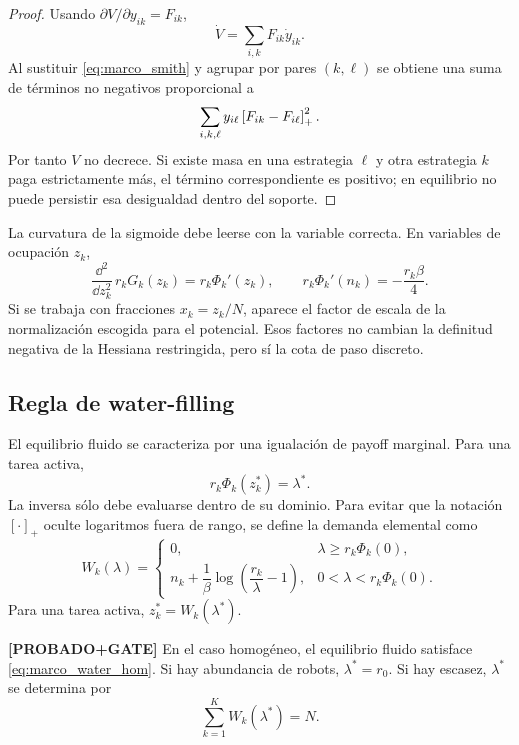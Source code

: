 \begin{proof}
Usando $\partial V/\partial y_{ik}=F_{ik}$,
\[
  \dot V=\sum_{i,k}F_{ik}\dot y_{ik}.
\]
Al sustituir \eqref{eq:marco_smith} y agrupar por pares $(k,\ell)$ se obtiene una suma
de términos no negativos proporcional a
\[
  \sum_{i,k,\ell}y_{i\ell}\left[F_{ik}-F_{i\ell}\right]_{+}^2.
\]
Por tanto $V$ no decrece. Si existe masa en una estrategia $\ell$ y otra estrategia
$k$ paga estrictamente más, el término correspondiente es positivo; en equilibrio no
puede persistir esa desigualdad dentro del soporte.
\end{proof}

\begin{observacion}
La curvatura de la sigmoide debe leerse con la variable correcta. En variables de
ocupación $z_k$,
\[
  \frac{\dd^2}{\dd z_k^2}\,r_kG_k(z_k)
  =
  r_k\Phi_k'(z_k),
  \qquad
  r_k\Phi_k'(n_k)=-\frac{r_k\beta}{4}.
\]
Si se trabaja con fracciones $x_k=z_k/N$, aparece el factor de escala de la
normalización escogida para el potencial. Esos factores no cambian la definitud
negativa de la Hessiana restringida, pero sí la cota de paso discreto.
\end{observacion}

\subsection{Regla de water-filling}

El equilibrio fluido se caracteriza por una igualación de payoff marginal. Para una
tarea activa,
\[
  r_k\Phi_k(z_k^*)=\lambda^*.
\]
La inversa sólo debe evaluarse dentro de su dominio. Para evitar que la notación
$[\cdot]_+$ oculte logaritmos fuera de rango, se define la demanda elemental como
\begin{equation}
  W_k(\lambda)=
  \begin{cases}
  0,
  & \lambda\ge r_k\Phi_k(0),\\[4pt]
  n_k+\dfrac{1}{\beta}\log\!\left(\dfrac{r_k}{\lambda}-1\right),
  & 0<\lambda<r_k\Phi_k(0).
  \end{cases}
  \label{eq:marco_water_hom}
\end{equation}
Para una tarea activa, $z_k^*=W_k(\lambda^*)$.

\begin{teorema} \textbf{[PROBADO+GATE]}
En el caso homogéneo, el equilibrio fluido satisface \eqref{eq:marco_water_hom}. Si hay
abundancia de robots, $\lambda^*=r_0$. Si hay escasez, $\lambda^*$ se determina por
\[
  \sum_{k=1}^{K}W_k(\lambda^*)=N.
\]
\end{teorema}

